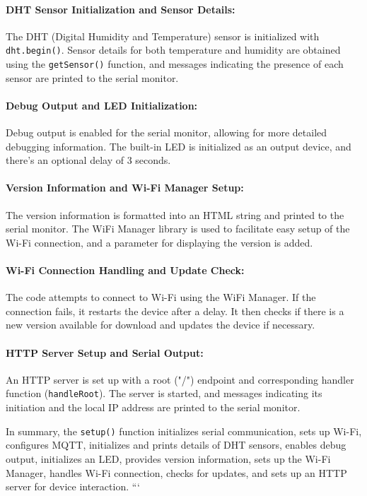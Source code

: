 \paragraph{DHT Sensor Initialization and Sensor Details:}
The DHT (Digital Humidity and Temperature) sensor is initialized with \texttt{dht.begin()}. Sensor details for both temperature and humidity are obtained using the \texttt{getSensor()} function, and messages indicating the presence of each sensor are printed to the serial monitor.

\paragraph{Debug Output and LED Initialization:}
Debug output is enabled for the serial monitor, allowing for more detailed debugging information. The built-in LED is initialized as an output device, and there's an optional delay of 3 seconds.

\paragraph{Version Information and Wi-Fi Manager Setup:}
The version information is formatted into an HTML string and printed to the serial monitor. The WiFi Manager library is used to facilitate easy setup of the Wi-Fi connection, and a parameter for displaying the version is added.

\paragraph{Wi-Fi Connection Handling and Update Check:}
The code attempts to connect to Wi-Fi using the WiFi Manager. If the connection fails, it restarts the device after a delay. It then checks if there is a new version available for download and updates the device if necessary.

\paragraph{HTTP Server Setup and Serial Output:}
An HTTP server is set up with a root ("/") endpoint and corresponding handler function (\texttt{handleRoot}). The server is started, and messages indicating its initiation and the local IP address are printed to the serial monitor.

In summary, the \texttt{setup()} function initializes serial communication, sets up Wi-Fi, configures MQTT, initializes and prints details of DHT sensors, enables debug output, initializes an LED, provides version information, sets up the Wi-Fi Manager, handles Wi-Fi connection, checks for updates, and sets up an HTTP server for device interaction.
```
